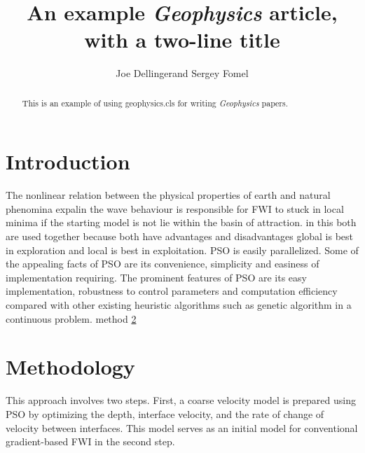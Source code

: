\documentclass[paper,revised]{geophysics}
\begin{document}
\title{An example \emph{Geophysics} article, \\ with a two-line title}

\renewcommand{\thefootnote}{\fnsymbol{footnote}} 


\address{
\footnotemark[1]BP UTG, \\
200 Westlake Park Blvd, \\
Houston, TX, 77079 \\
\footnotemark[2]Bureau of Economic Geology, \\
John A. and Katherine G. Jackson School of Geosciences \\
The University of Texas at Austin \\
University Station, Box X \\
Austin, TX 78713-8924}
\author{Joe Dellinger\footnotemark[1] and Sergey Fomel\footnotemark[2]}


\maketitle

\begin{abstract}
  This is an example of using \textsf{geophysics.cls} for writing
  \emph{Geophysics} papers.
\end{abstract}

\section{Introduction}

The nonlinear relation between the physical properties of earth and natural phenomina expalin the wave behaviour is responsible for FWI to stuck in local minima if the starting model is not lie within the basin of attraction. in this both are used together because both have advantages and disadvantages global is best in exploration and local is best in exploitation. PSO is easily parallelized.
Some of the appealing facts of PSO are its convenience, simplicity and easiness of implementation requiring.
The prominent features of PSO are its easy implementation, robustness to control parameters and computation efficiency compared with other existing heuristic algorithms such as genetic algorithm in a continuous problem.
method \ref{method}
\section{Methodology}
\label{method}
This approach involves two steps. First, a coarse velocity model is prepared using PSO by optimizing the depth, interface velocity, and the rate of change of velocity between interfaces. This model serves as an initial model for conventional gradient-based FWI in the second step.
\end{document}
